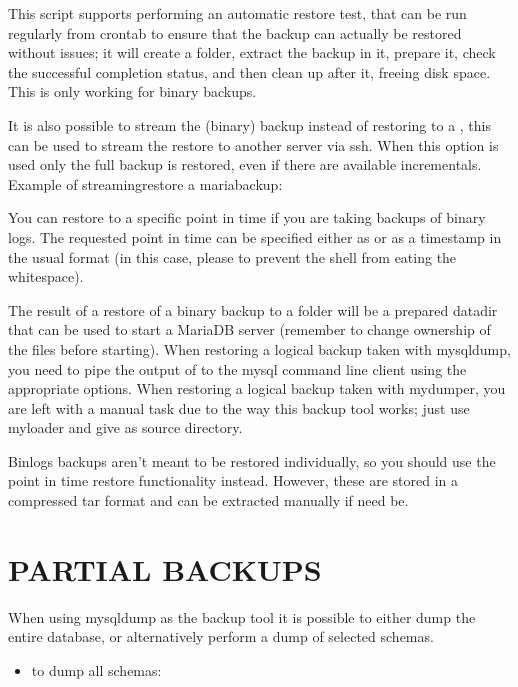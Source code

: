 \documentclass[letterpaper,10pt,english]{sphinxmanual}
\begin{document}
\sphinxAtStartPar
This script supports performing an automatic restore test, that can be run regularly
from crontab to ensure that the backup can actually be restored without issues; it
will create a folder, extract the backup in it, prepare it, check the successful
completion status, and then clean up after it, freeing disk space. This is only
working for binary backups.

\sphinxAtStartPar
It is also possible to stream the (binary) backup instead of restoring to a
, this can be used to stream the restore to another server via ssh.
When this option is used only the full backup is restored, even if there are available
incrementals.  Example of streaming\sphinxhyphen{}restore a mariabackup:

\sphinxAtStartPar
{}

\sphinxAtStartPar
You can restore to a specific point in time if you are taking backups of binary logs.
The requested point in time can be specified either as  or as a timestamp
in the usual  format (in this case, please 
to prevent the shell from eating the whitespace).

\sphinxAtStartPar
The result of a restore of a binary backup to a folder will be a prepared datadir
that can be used to start a MariaDB server (remember to change ownership of the files
before starting). When restoring a logical backup taken with mysqldump, you need
to pipe the output of  to the mysql command line client using the
appropriate options. When restoring a logical backup taken with mydumper, you are
left with a manual task due to the way this backup tool works; just use myloader
and give  as source directory.

\sphinxAtStartPar
Binlogs backups aren’t meant to be restored individually, so you should use the
point in time restore functionality instead. However, these are stored in a compressed
tar format and can be extracted manually if need be.


\section{PARTIAL BACKUPS}
\label{\detokenize{mariadb-backup-manager:partial-backups}}
\sphinxAtStartPar
When using mysqldump as the backup tool it is possible to either dump the entire database, or
alternatively perform a dump of selected schemas.
\begin{itemize}
\item {} 
\sphinxAtStartPar
to dump all schemas:

\end{itemize}
\end{document}

